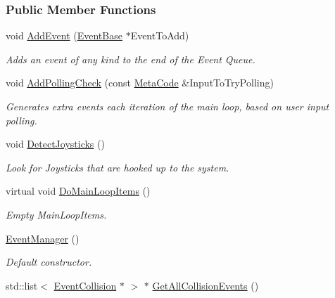 \subsubsection*{Public Member Functions}
\begin{DoxyCompactItemize}
\item 
void \hyperlink{classMezzanine_1_1EventManager_aa791c61d2665422614d54c7653e87e88}{AddEvent} (\hyperlink{classMezzanine_1_1EventBase}{EventBase} $\ast$EventToAdd)
\begin{DoxyCompactList}\small\item\em Adds an event of any kind to the end of the Event Queue. \item\end{DoxyCompactList}\item 
void \hyperlink{classMezzanine_1_1EventManager_a2da4ef46b2ce56206412782eec43d93e}{AddPollingCheck} (const \hyperlink{classMezzanine_1_1MetaCode}{MetaCode} \&InputToTryPolling)
\begin{DoxyCompactList}\small\item\em Generates extra events each iteration of the main loop, based on user input polling. \item\end{DoxyCompactList}\item 
void \hyperlink{classMezzanine_1_1EventManager_a3cf0fd9e33392aa24e9a735363212185}{DetectJoysticks} ()
\begin{DoxyCompactList}\small\item\em Look for Joysticks that are hooked up to the system. \item\end{DoxyCompactList}\item 
virtual void \hyperlink{classMezzanine_1_1EventManager_a69d44403974ed8d974846e929eb8adda}{DoMainLoopItems} ()
\begin{DoxyCompactList}\small\item\em Empty MainLoopItems. \item\end{DoxyCompactList}\item 
\hyperlink{classMezzanine_1_1EventManager_a95ce9d2d865b0d8d9468448969b0ade2}{EventManager} ()
\begin{DoxyCompactList}\small\item\em Default constructor. \item\end{DoxyCompactList}\item 
std::list$<$ \hyperlink{classMezzanine_1_1EventCollision}{EventCollision} $\ast$ $>$ $\ast$ \hyperlink{classMezzanine_1_1EventManager_ab630dfe228b7a4246680953cdfbbfc0a}{GetAllCollisionEvents} ()

\end{DoxyCompactItemize}
